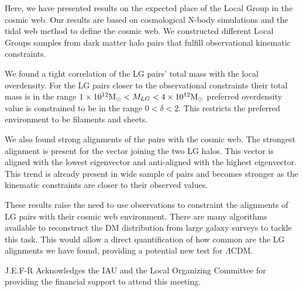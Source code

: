 \documentclass{iau}
\newcommand{\Msun}{{\ifmmode{{\rm {M_{\odot}}}}\else{${\rm{M_{\odot}}}$}\fi}}
\begin{document}
Here, we have presented results on the expected place of the Local
Group in the cosmic web. Our results are based on cosmological N-body
simulations and the tidal web method to define the cosmic web. We
constructed different Local Groups samples from dark matter halo pairs
that fulfill observational kinematic constraints. 

We found a tight correlation of the LG pairs' total mass with the
local overdensity. For the LG pairs closer to the observational
constraints their total mass is in the range $1\times 10^{12}\Msun <
M_{LG} < 4\times 10^{12}\Msun$ preferred overdensity value is
constrained to be in the range $0<\delta <2$. This restricts the
preferred environment to be filaments and sheets. 

We also found strong alignments of the pairs with the cosmic web. The
strongest alignment is present for the vector joining the two LG
halos. This vector is aligned with the lowest eigenvector and
anti-aligned with the highest eigenvector. This trend is already
present in wide sample of pairs and becomes stronger as the kinematic
constraints are closer to their observed values. 


These results  raise the need to use observations to constraint
the alignments of LG pairs with their cosmic web environment. There
are many algorithms available to reconstruct the DM distribution from
large galaxy surveys to tackle this task.  This would allow a direct
quantification of how common are the LG alignments we have found, 
providing a potential new test for $\Lambda$CDM. 



J.E.F-R Acknowledges the IAU and the Local Organizing Committee for
providing the financial support to attend this meeting.  


 
\end{document}
